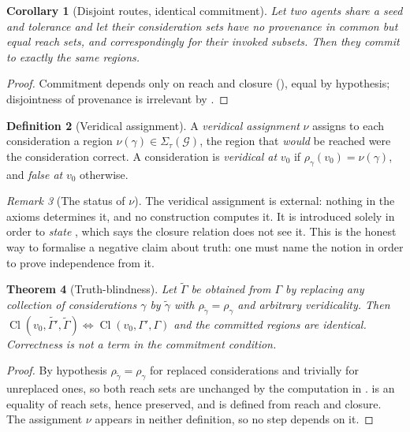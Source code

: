 \documentclass[11pt,a4paper]{article}
\theoremstyle{clstyle}
\newtheorem{theorem}{Theorem}[section]
\newtheorem{corollary}[theorem]{Corollary}
\theoremstyle{definition}
\newtheorem{definition}[theorem]{Definition}
\theoremstyle{remark}
\newtheorem{remark}[theorem]{Remark}
\DeclareMathOperator{\Cl}{Cl}
\newcommand{\Gph}{\mathcal{G}}
\newcommand{\Sig}{\Sigma}
\begin{document}
\begin{corollary}[Disjoint routes, identical commitment]
\label{cor:routes}
Let two agents share a seed and tolerance and let their consideration sets
have \emph{no provenance in common} but equal reach sets, and correspondingly
for their invoked subsets. Then they commit to exactly the same regions.
\end{corollary}

\begin{proof}
Commitment depends only on reach and closure (), equal
by hypothesis; disjointness of provenance is irrelevant by .
\end{proof}

\begin{definition}[Veridical assignment]
\label{def:veridical}
A \emph{veridical assignment} $\nu$ assigns to each consideration a region
$\nu(\gamma)\in\Sig_\tau(\Gph)$, the region that \emph{would} be reached were
the consideration correct. A consideration is \emph{veridical at} $v_0$ if
$\rho_\gamma(v_0)=\nu(\gamma)$, and \emph{false at} $v_0$ otherwise.
\end{definition}

\begin{remark}[The status of $\nu$]
\label{rem:nu}
The veridical assignment is external: nothing in the axioms determines it,
and no construction computes it. It is introduced solely in order to
\emph{state} , which says the closure relation does not
see it. This is the honest way to formalise a negative claim about truth:
one must name the notion in order to prove independence from it.
\end{remark}

\begin{theorem}[Truth-blindness]
\label{thm:truth-blind}
Let $\widetilde\Gamma$ be obtained from $\Gamma$ by replacing any collection
of considerations $\gamma$ by $\widetilde\gamma$ with
$\rho_{\widetilde\gamma}=\rho_\gamma$ and arbitrary veridicality. Then
$\Cl(v_0,\widetilde{\Gamma'},\widetilde\Gamma)\iff\Cl(v_0,\Gamma',\Gamma)$
and the committed regions are identical. Correctness is not a term in the
commitment condition.
\end{theorem}

\begin{proof}
By hypothesis $\rho_{\widetilde\gamma}=\rho_\gamma$ for replaced
considerations and trivially for unreplaced ones, so both reach sets are
unchanged by the computation in .  is an
equality of reach sets, hence preserved, and  is defined
from reach and closure. The assignment $\nu$ appears in neither definition,
so no step depends on it.
\end{proof}
\end{document}
